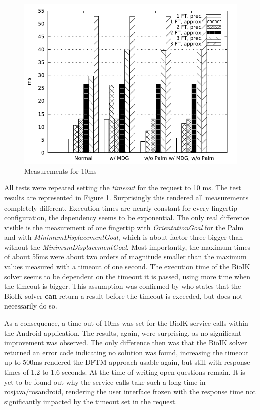 \begin{figure}
	\caption{\label{fig:eval:10ms}Measurements for 10ms}
	\begin{center}
		\includegraphics{assets/chpt_eval/10ms.pdf}
	\end{center}
\end{figure}

All tests were repeated setting the \textit{timeout} for the request to 10 ms. The test results are represented in Figure \ref{fig:eval:10ms}. Surprisingly this rendered all measurements completely different. Execution times are nearly constant for every fingertip configuration, the dependency seems to be exponential. The only real difference visible is the measurement of one fingertip with \textit{OrientationGoal} for the Palm and with \textit{MinimumDisplacementGoal}, which is about factor three bigger than without the \textit{MinimumDisplacementGoal}. Most importantly, the maximum times of about 55ms were about two orders of magnitude smaller than the maximum values measured with a timeout of one second. The execution time of the BioIK solver seems to be dependent on the timeout it is passed, using more time when the timeout is bigger. This assumption was confirmed by \citeauthor{Ruppel17}\cite{Ruppel17} who states that the BioIK solver \textbf{can} return a result before the timeout is exceeded, but does not necessarily do so.

As a consequence, a time-out of 10ms was set for the BioIK service calls within the Android application. The results, again, were surprising, as no significant improvement was observed. The only difference then was that the BioIK solver returned an error code indicating no solution was found, increasing the timeout up to 500ms rendered the DFTM approach usable again, but still with response times of 1.2 to 1.6 seconds. At the time of writing open questions remain. It is yet to be found out why the service calls take such a long time in rosjava/rosandroid, rendering the user interface frozen with the response time not significantly impacted by the timeout set in the request.

